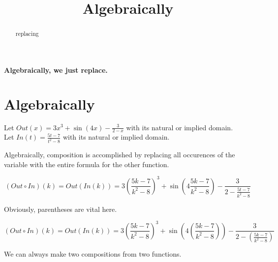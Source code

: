 \documentclass{ximera}
\title{Algebraically}
\begin{document}
\begin{abstract}
replacing
\end{abstract}
\maketitle









\textbf{\textcolor{purple!85!blue}{Algebraically, we just replace.}}

















\section*{Algebraically}







Let $Out(x) = 3x^3 + \sin(4x) - \frac{3}{2-x}$ with its natural or implied domain. \\
Let $In(t) = \frac{5t-7}{t^2-8}$ with its natural or implied domain. 



Algebraically, composition is accomplished by replacing all occurences of the variable with the entire formula for the other function.




\[
(Out \circ In)(k) = Out(In(k)) = 3 \left( \frac{5k-7}{k^2-8} \right)^3 + \sin(4 \frac{5k-7}{k^2-8}) - \frac{3}{2-\frac{5t-7}{k^2-8}}
\]





Obviously, parentheses are vital here.





\[
(Out \circ In)(k) = Out(In(k)) = 3 \left( \frac{5k-7}{k^2-8} \right)^3 + \sin\left( 4 \left( \frac{5k-7}{k^2-8} \right) \right) - \frac{3}{2 - \left( \frac{5k-7}{k^2-8} \right)}
\]






We can always make two compositions from two functions.
\end{document}
